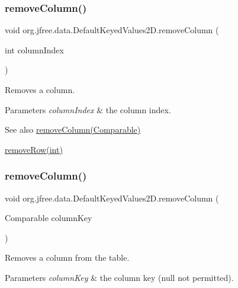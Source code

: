 \subsubsection{\texorpdfstring{remove\+Column()}{removeColumn()}\hspace{0.1cm}{\footnotesize\ttfamily [1/2]}}
{\footnotesize\ttfamily void org.\+jfree.\+data.\+Default\+Keyed\+Values2\+D.\+remove\+Column (\begin{DoxyParamCaption}\item[{int}]{column\+Index }\end{DoxyParamCaption})}

Removes a column.


\begin{DoxyParams}{Parameters}
{\em column\+Index} & the column index.\\
\hline
\end{DoxyParams}
\begin{DoxySeeAlso}{See also}
\mbox{\hyperlink{classorg_1_1jfree_1_1data_1_1_default_keyed_values2_d_a39f5509250ab63ae4c34f1d68767cc82}{remove\+Column(\+Comparable)}} 

\mbox{\hyperlink{classorg_1_1jfree_1_1data_1_1_default_keyed_values2_d_ad0ba13bb6997d580f816f62297d7ef96}{remove\+Row(int)}} 
\end{DoxySeeAlso}
\mbox{\label{classorg_1_1jfree_1_1data_1_1_default_keyed_values2_d_a39f5509250ab63ae4c34f1d68767cc82}} 
\subsubsection{\texorpdfstring{remove\+Column()}{removeColumn()}\hspace{0.1cm}{\footnotesize\ttfamily [2/2]}}
{\footnotesize\ttfamily void org.\+jfree.\+data.\+Default\+Keyed\+Values2\+D.\+remove\+Column (\begin{DoxyParamCaption}\item[{Comparable}]{column\+Key }\end{DoxyParamCaption})}

Removes a column from the table.


\begin{DoxyParams}{Parameters}
{\em column\+Key} & the column key ({\ttfamily null} not permitted).\\
\hline
\end{DoxyParams}

